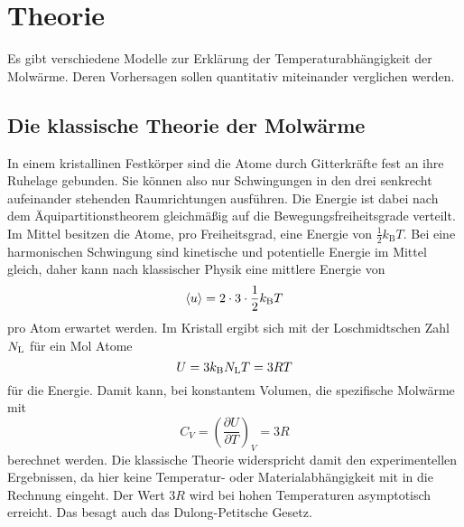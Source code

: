 ﻿\section{Theorie}
\label{sec:Theorie}
Es gibt verschiedene Modelle zur Erklärung der Temperaturabhängigkeit der Molwärme. Deren Vorhersagen sollen quantitativ miteinander verglichen werden.
\subsection{Die klassische Theorie der Molwärme}
In einem kristallinen Festkörper sind die Atome durch Gitterkräfte fest an ihre Ruhelage gebunden. Sie können also nur Schwingungen in den drei senkrecht aufeinander stehenden Raumrichtungen ausführen. Die Energie ist dabei nach dem Äquipartitionstheorem gleichmäßig auf die Bewegungsfreiheitsgrade verteilt. Im Mittel besitzen die Atome, pro Freiheitsgrad, eine Energie von $\frac{1}{2}k_\text{B}T$. Bei eine harmonischen Schwingung sind kinetische und potentielle Energie im Mittel gleich, daher kann nach klassischer Physik eine mittlere Energie von
\begin{equation*}
	\langle u \rangle = 2\cdot3\cdot\frac{1}{2}k_\text B T
\end{equation*}
pro Atom erwartet werden.
Im Kristall ergibt sich mit der Loschmidtschen Zahl $N_\text L$ für ein Mol Atome 
\begin{equation*}
	U = 3k_\text B N_\text L T = 3RT
\end{equation*}
für die Energie.
Damit kann, bei konstantem Volumen, die spezifische Molwärme mit
\begin{equation*}
	C_V = \left(\frac{\partial U}{\partial T}\right)_V = 3R
\end{equation*}
berechnet werden.
Die klassische Theorie widerspricht damit den experimentellen Ergebnissen, da hier keine Temperatur- oder Materialabhängigkeit mit in die Rechnung eingeht. Der Wert $3R$ wird bei hohen Temperaturen asymptotisch erreicht.
Das besagt auch das Dulong-Petitsche Gesetz.
